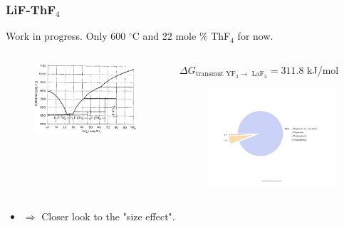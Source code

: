 \documentclass{beamer}
\begin{document}
\begin{frame}
    \frametitle{LiF-ThF$_4$}
    Work in progress. Only 600 $^{\circ}$C and 22 mole \% ThF$_4$ for now.
    \vspace{0.5cm}
    \begin{columns}
        \begin{column}{5cm}
            \begin{figure}
                \includegraphics[width=\textwidth]{LiFThF4ddp.png}
            \end{figure}
        \end{column}
        \begin{column}{7cm}
            $\Delta G_{\text{transmut YF}_3 \rightarrow\text{ LaF}_3} = 311.8$ kJ/mol
            \begin{figure}
                \includegraphics[width=\textwidth]{LiFTF4dGchart}
            \end{figure}
        \end{column}
    \end{columns}
    \begin{itemize}
        \item $\Rightarrow$ Closer look to the "size effect".
    \end{itemize}
\end{frame}
\end{document}
